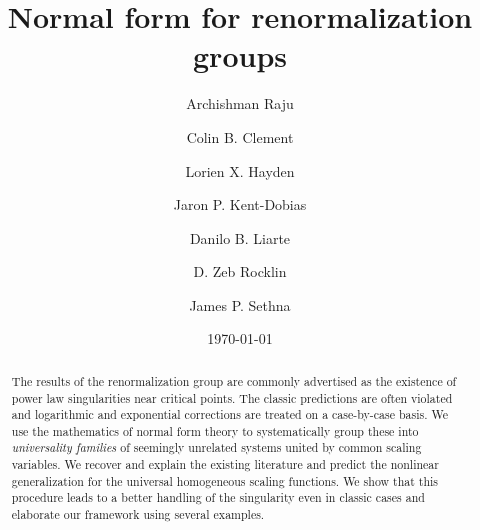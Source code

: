 \documentclass[
 reprint,
 amsmath,amssymb,
 aps, superscriptaddress, pre
]{revtex4-1}
\begin{document}

\title{Normal form for renormalization groups}%

\author{Archishman Raju}
\author{Colin B. Clement}
\author{Lorien X. Hayden}
\author{Jaron P. Kent-Dobias}
\author{Danilo B. Liarte}
\author{D. Zeb Rocklin}
\author{James P. Sethna}



\begin{abstract}
The results of the renormalization group are commonly advertised as the existence of power law singularities near critical points. The classic predictions are often violated and logarithmic and exponential corrections are treated on a case-by-case basis. We use the mathematics of normal form theory to systematically group these into \textit{universality families} of seemingly unrelated systems united by common scaling variables. We recover and explain the existing literature and predict the nonlinear generalization for the universal homogeneous scaling functions. We show that this procedure leads to a better handling of the singularity even in classic cases and elaborate our framework using several examples. \end{abstract}
 \date{\today}%



\maketitle
\end{document}
